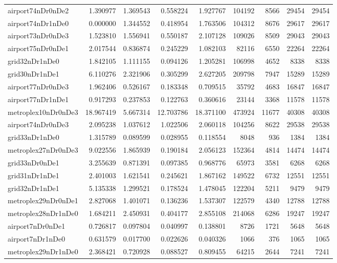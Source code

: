 \begin{longtable}{|l|r|r|r|r|r|r|r|r|}
airport74nDr0nDe2 & 1.390977 & 1.369543 & 0.558224 & 1.927767 & 104192 & 8566 & 29454 & 29454 \\
airport74nDr1nDe0 & 0.000000 & 1.344552 & 0.418954 & 1.763506 & 104312 & 8676 & 29617 & 29617 \\
airport73nDr0nDe3 & 1.523810 & 1.556941 & 0.550187 & 2.107128 & 109026 & 8509 & 29043 & 29043 \\
airport75nDr0nDe1 & 2.017544 & 0.836874 & 0.245229 & 1.082103 & 82116 & 6550 & 22264 & 22264 \\
grid32nDr1nDe0 & 1.842105 & 1.111155 & 0.094126 & 1.205281 & 106998 & 4652 & 8338 & 8338 \\
grid30nDr1nDe1 & 6.110276 & 2.321906 & 0.305299 & 2.627205 & 209798 & 7947 & 15289 & 15289 \\
airport77nDr0nDe3 & 1.962406 & 0.526167 & 0.183348 & 0.709515 & 35792 & 4683 & 16847 & 16847 \\
airport77nDr1nDe1 & 0.917293 & 0.237853 & 0.122763 & 0.360616 & 23144 & 3368 & 11578 & 11578 \\
metroplex10nDr0nDe3 & 18.967419 & 5.667314 & 12.703786 & 18.371100 & 473924 & 11677 & 40308 & 40308 \\
airport74nDr0nDe3 & 2.095238 & 1.037612 & 1.022506 & 2.060118 & 104256 & 8622 & 29538 & 29538 \\
grid33nDr1nDe0 & 1.315789 & 0.089599 & 0.028955 & 0.118554 & 8048 & 936 & 1384 & 1384 \\
metroplex27nDr0nDe3 & 9.022556 & 1.865939 & 0.190184 & 2.056123 & 152364 & 4814 & 14474 & 14474 \\
grid33nDr0nDe1 & 3.255639 & 0.871391 & 0.097385 & 0.968776 & 65973 & 3581 & 6268 & 6268 \\
grid31nDr1nDe1 & 2.401003 & 1.621541 & 0.245621 & 1.867162 & 149522 & 6732 & 12551 & 12551 \\
grid32nDr1nDe1 & 5.135338 & 1.299521 & 0.178524 & 1.478045 & 122204 & 5211 & 9479 & 9479 \\
metroplex29nDr0nDe1 & 2.827068 & 1.401071 & 0.136236 & 1.537307 & 122579 & 4340 & 12788 & 12788 \\
metroplex28nDr1nDe0 & 1.684211 & 2.450931 & 0.404177 & 2.855108 & 214068 & 6286 & 19247 & 19247 \\
airport7nDr0nDe1 & 0.726817 & 0.097804 & 0.040997 & 0.138801 & 8726 & 1721 & 5648 & 5648 \\
airport7nDr1nDe0 & 0.631579 & 0.017700 & 0.022626 & 0.040326 & 1066 & 376 & 1065 & 1065 \\
metroplex29nDr1nDe0 & 2.368421 & 0.720928 & 0.088527 & 0.809455 & 64215 & 2644 & 7241 & 7241 \\

\end{longtable}
